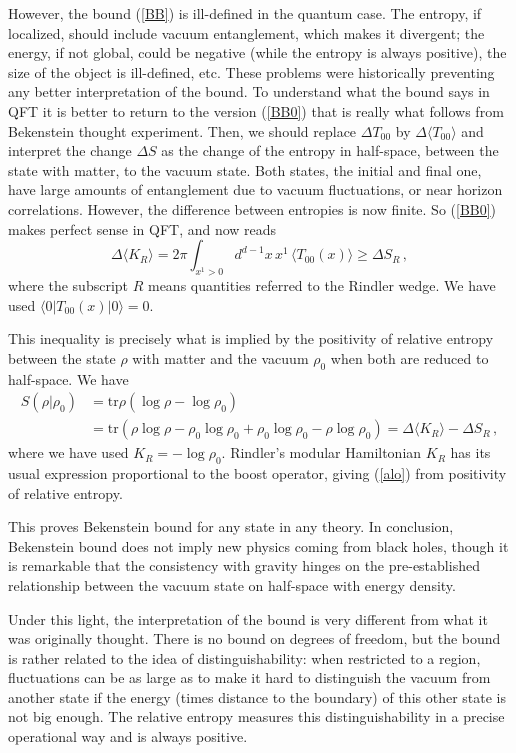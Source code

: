\documentclass[12pt]{article}
\numberwithin{equation}{section}
\newcommand{\be}{\begin{equation}}
\newcommand{\ee}{\end{equation}}
\begin{document}
However, the bound (\ref{BB}) is ill-defined in the quantum case. The entropy, if localized, should include vacuum entanglement, which makes it divergent; the energy, if not global, could be negative (while the entropy is always positive), the size of the object is ill-defined, etc. These problems were historically preventing any better interpretation of the bound. To understand what the bound says in QFT it is better to return to the version (\ref{BB0}) that is really what follows from Bekenstein thought experiment. Then, we should replace $\Delta T_{00}$ by $\Delta \langle T_{00}\rangle $ and interpret the change $\Delta S$ as the change of the entropy in half-space, between the state with matter, to the vacuum state. Both states, the initial and final one, have large amounts of entanglement due to vacuum fluctuations, or near horizon correlations. However, the difference between entropies is now finite. So (\ref{BB0}) makes perfect sense in QFT, and now reads
\be
\Delta \langle K_R \rangle= 2\pi \int_{x^1> 0}d^{d-1}x\,  x^1\,  \langle T_{00}(x)\rangle \ge \Delta S_R\,,           \label{alo}
\ee
where the subscript $R$ means quantities referred to the Rindler wedge. We have used $\langle 0|T_{00}(x)|0\rangle=0$. 

This inequality is precisely what is implied by the positivity of relative entropy between the state $\rho$ with matter and the vacuum $\rho_0$ when both are reduced to half-space. We have
\begin{align}
S(\rho|\rho_0) &=\textrm{tr} \rho (\log \rho -\log \rho_0) \nonumber\\
&= \textrm{tr} \left(\rho \log \rho -\rho_0\log \rho_0 + \rho_0\log \rho_0-\rho \log \rho_0\right)=\Delta \langle K_R \rangle - \Delta S_R\,,
\end{align}
where we have used $K_R=-\log \rho_0$. Rindler's modular Hamiltonian $K_R$ has its usual expression proportional to the boost operator, giving (\ref{alo}) from positivity of relative entropy.

This proves Bekenstein bound for any state in any theory. In conclusion, Bekenstein bound does not imply new physics coming from black holes, though it is remarkable that the consistency with gravity hinges on the pre-established relationship between the vacuum state on half-space with energy density.      

Under this light, the interpretation of the bound is very different from what it was originally thought. There is no bound on degrees of freedom, but the bound is rather related to the idea of distinguishability: when restricted to a region, fluctuations can be as large as to make it hard to distinguish the vacuum from another state if the energy (times distance to the boundary) of this other state is not big enough. The relative entropy measures this distinguishability in a precise operational way and is always positive.     
\end{document}
